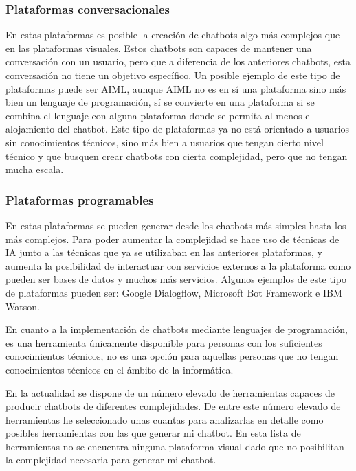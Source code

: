 \subsubsection*{Plataformas conversacionales}

En estas plataformas es posible la creación de chatbots algo más complejos que en las plataformas visuales. Estos chatbots son capaces de mantener una conversación con un usuario, pero que a diferencia de los anteriores chatbots, esta conversación no tiene un objetivo específico. Un posible ejemplo de este tipo de plataformas puede ser AIML, aunque AIML no es en sí una plataforma sino más bien un lenguaje de programación, sí se convierte en una plataforma si se combina el lenguaje con alguna plataforma donde se permita al menos el alojamiento del chatbot. Este tipo de plataformas ya no está orientado a usuarios sin conocimientos técnicos, sino más bien a usuarios que tengan cierto nivel técnico y que busquen crear chatbots con cierta complejidad, pero que no tengan mucha escala.

\subsubsection*{Plataformas programables}

En estas plataformas se pueden generar desde los chatbots más simples hasta los más complejos. Para poder aumentar la complejidad se hace uso de técnicas de \gls{IA} junto a las técnicas que ya se utilizaban en las anteriores plataformas, y aumenta la posibilidad de interactuar con servicios externos a la plataforma como pueden ser bases de datos y muchos más servicios. Algunos ejemplos de este tipo de plataformas pueden ser: Google Dialogflow, Microsoft Bot Framework e IBM Watson. \newline\newline

En cuanto a la implementación de chatbots mediante lenguajes de programación, es una herramienta únicamente disponible para personas con los suficientes conocimientos técnicos, no es una opción para aquellas personas que no tengan conocimientos técnicos en el ámbito de la informática.

En la actualidad se dispone de un número elevado de herramientas capaces de producir chatbots de diferentes complejidades. De entre este número elevado de herramientas he seleccionado unas cuantas para analizarlas en detalle como posibles herramientas con las que generar mi chatbot. En esta lista de herramientas no se encuentra ninguna plataforma visual dado que no posibilitan la complejidad necesaria para generar mi chatbot.

